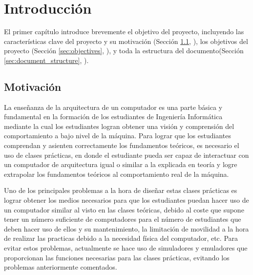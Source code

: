 \chead[]{}
\renewcommand{\headrulewidth}{0.5pt}

\lfoot[]{}
\cfoot[]{}
\rfoot[]{}
\renewcommand{\footrulewidth}{0pt}

\chapter{Introducción}
\label{ch:introduction}

El primer capítulo introduce brevemente el objetivo del proyecto, incluyendo las características clave del proyecto y su motivación (Sección \ref{sec:background_and_motivation}, \textit{}), los objetivos del proyecto (Sección \ref{sec:objectives}, \textit{}), y toda la estructura del documento(Sección \ref{sec:document_structure}, \textit{}).

\section{Motivación}
\label{sec:background_and_motivation}

La enseñanza de la arquitectura de un computador es una parte básica y fundamental en la formación de los estudiantes de Ingeniería Informática mediante la cual los estudiantes logran obtener una visión y comprensión del comportamiento a bajo nivel de la máquina. Para lograr que los estudiantes comprendan y asienten correctamente los fundamentos teóricos, es necesario el uso de clases prácticas, en donde el estudiante pueda ser capaz de interactuar con un computador de arquitectura igual o similar a la explicada en teoría y logre extrapolar los fundamentos teóricos al comportamiento real de la máquina.

Uno de los principales problemas a la hora de diseñar estas clases prácticas es lograr obtener los medios necesarios para que los estudiantes puedan hacer uso de un computador similar al visto en las clases teóricas, debido al coste que supone tener un número suficiente de computadores para el número de estudiantes que deben hacer uso de ellos y su mantenimiento, la limitación de movilidad a la hora de realizar las practicas debido a la necesidad física del computador, etc. Para evitar estos problemas, actualmente se hace uso de simuladores y emuladores que proporcionan las funciones necesarias para las clases prácticas, evitando los problemas anteriormente comentados.

